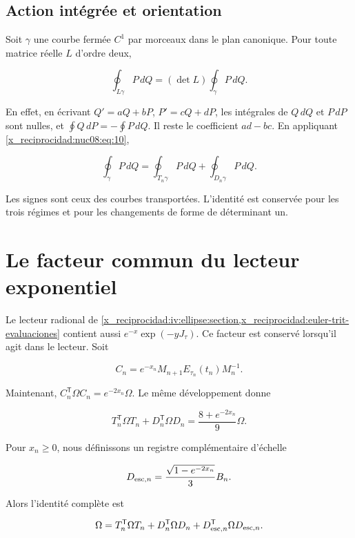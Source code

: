 \subsection{Action intégrée et orientation}

Soit \(\gamma\) une courbe fermée \(C^1\) par morceaux dans le plan canonique. Pour toute matrice réelle \(L\) d’ordre deux,

\[
\oint_{L\gamma}P\,dQ=(\det L)\oint_\gamma P\,dQ.
\]

En effet, en écrivant \(Q'=aQ+bP\), \(P'=cQ+dP\), les intégrales de \(Q\,dQ\) et \(P\,dP\) sont nulles, et \(\oint Q\,dP=-\oint P\,dQ\). Il reste le coefficient \(ad-bc\). En appliquant \eqref{x_reciprocidad:nuc08:eq:10},

\begin{equation}
\boxed{\oint_\gamma P\,dQ
=\oint_{T_n\gamma}P\,dQ+\oint_{D_n\gamma}P\,dQ.}
\label{x_reciprocidad:nuc08:eq:11}
\end{equation}

Les signes sont ceux des courbes transportées. L’identité est conservée pour les trois régimes et pour les changements de forme de déterminant un.

\section{Le facteur commun du lecteur exponentiel}

Le lecteur radional de \cref{x_reciprocidad:iv:ellipse:section,x_reciprocidad:euler-trit-evaluaciones} contient aussi \(e^{-x}\exp(-yJ_\tau)\). Ce facteur est conservé lorsqu’il agit dans le lecteur. Soit

\[
C_n=e^{-x_n}M_{n+1}E_{\tau_n}(t_n)M_n^{-1}.
\]

Maintenant, \(C_n^\mathsf T\Omega C_n=e^{-2x_n}\Omega\). Le même développement donne

\begin{equation}
T_n^\mathsf T\Omega T_n+D_n^\mathsf T\Omega D_n
=\frac{8+e^{-2x_n}}9\Omega.
\label{x_reciprocidad:nuc08:eq:12}
\end{equation}

Pour \(x_n\geq0\), nous définissons un registre complémentaire d’échelle

\[
D_{{\rm esc},n}=\frac{\sqrt{1-e^{-2x_n}}}{3}B_n.
\]

Alors l’identité complète est

\begin{equation}
\Omega=T_n^\mathsf T\Omega T_n+D_n^\mathsf T\Omega D_n
+D_{{\rm esc},n}^\mathsf T\Omega D_{{\rm esc},n}.
\label{x_reciprocidad:nuc08:eq:13}
\end{equation}

